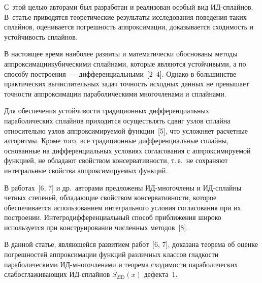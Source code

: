 \begin{multicols}{2}
  С~этой целью авторами был разработан и реализован особый вид 
ИД-сплайнов. В~статье приводятся теоретические 
результаты исследования поведения таких сплайнов, оценивается погрешность 
аппроксимации, доказывается сходимость и устойчивость сплайнов.
  
  В настоящее время наиболее развиты и математически обоснованы методы 
аппроксимации\linebreak кубическими сплайнами, которые являются устойчивыми, а по 
способу построения~--- дифференциальными~[2--4]. Однако в большинстве 
практических вычислительных задач точность исходных данных не превышает 
точности аппроксимации параболическими многочленами и сплайнами. 
  
  Для обеспечения устойчивости традиционных дифференциальных 
параболических сплайнов приходится осуществлять сдвиг узлов сплайна 
относительно узлов аппроксимируемой функции~[5], что усложняет расчетные 
алгоритмы. Кроме того, все традиционные дифференциальные сплайны, 
основанные на дифференциальных условиях согласования с аппроксимируемой 
функцией, не обладают свойством консервативности, т.\,е.\ не сохраняют 
интегральные свойства аппроксимируемых функций.
  
  В работах~[6, 7] и др.\ авторами предложены 
ИД-мно\-го\-чле\-ны и ИД-сплай\-ны четных степеней, 
обладающие свойством консервативности, которое обеспечивается 
использованием интегрального условия согласования при их построении. 
Интегродифференциальный способ приближения широко используется при 
конструировании численных методов~[8]. 
  
  В данной статье, являющейся развитием работ~[6, 7], доказана теорема об 
оценке погрешностей аппроксимации функций различных классов гладкости 
параболическими ИД-мно\-го\-чле\-на\-ми и теорема сходимости 
параболических слабосглаживающих ИД-сплай\-нов $S_{2\mathrm{ID}}(x)$ дефекта~1.
  

\end{multicols}
